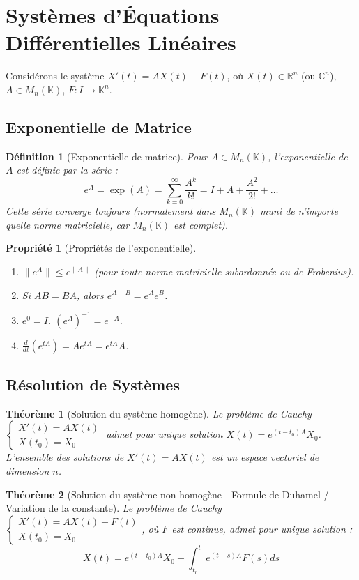\documentclass[a4paper]{article}
\newcommand{\R}{\mathbb{R}}
\newcommand{\C}{\mathbb{C}} %
\newcommand{\K}{\mathbb{K}} %
\newtheorem{theorem}{Théorème}[section]
\newtheorem{definition}{Définition}[section]
\newtheorem{propriete}{Propriété}[section] %
\begin{document}
\section{Systèmes d'Équations Différentielles Linéaires}
Considérons le système \(X'(t) = A X(t) + F(t)\), où \(X(t) \in \R^n\) (ou \(\C^n\)), \(A \in M_n(\K)\), \(F: I \to \K^n\).
\subsection{Exponentielle de Matrice}
\begin{definition}[Exponentielle de matrice]
    Pour \(A \in M_n(\K)\), l'exponentielle de \(A\) est définie par la série :
    \[ e^A = \exp(A) = \sum_{k=0}^\infty \frac{A^k}{k!} = I + A + \frac{A^2}{2!} + \dots \]
    Cette série converge toujours (normalement dans \(M_n(\K)\) muni de n'importe quelle norme matricielle, car \(M_n(\K)\) est complet).
\end{definition}
\begin{propriete}[Propriétés de l'exponentielle]
    \begin{enumerate}
        \item \(\|e^A\| \le e^{\|A\|}\) (pour toute norme matricielle subordonnée ou de Frobenius).
        \item Si \(AB=BA\), alors \(e^{A+B} = e^A e^B\).
        \item \(e^0 = I\). \((e^A)^{-1} = e^{-A}\).
        \item \(\frac{d}{dt} (e^{tA}) = A e^{tA} = e^{tA} A\).
    \end{enumerate}
\end{propriete}

\subsection{Résolution de Systèmes}
\begin{theorem}[Solution du système homogène]
    Le problème de Cauchy \(\begin{cases} X'(t) = A X(t) \\ X(t_0) = X_0 \end{cases}\)
    admet pour unique solution \(X(t) = e^{(t-t_0)A} X_0\).
    L'ensemble des solutions de \(X'(t)=AX(t)\) est un espace vectoriel de dimension \(n\).
\end{theorem}
\begin{theorem}[Solution du système non homogène - Formule de Duhamel / Variation de la constante]
    Le problème de Cauchy \(\begin{cases} X'(t) = A X(t) + F(t) \\ X(t_0) = X_0 \end{cases}\), où \(F\) est continue,
    admet pour unique solution :
    \[ X(t) = e^{(t-t_0)A} X_0 + \int_{t_0}^t e^{(t-s)A} F(s) ds \]
\end{theorem}
\end{document}
